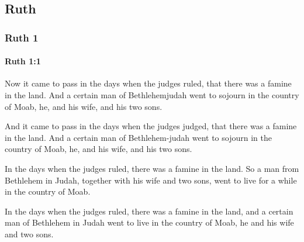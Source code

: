 \subsection{Ruth}
	\label{RUTH}

	\subsubsection{Ruth 1} %
		\label{RUTH-1}

		\paragraph{Ruth 1:1} %
			\label{RUTH-1-1}

			Now it came to pass in the days when the judges ruled, that there was a famine in the land. And a certain man of Bethlehemjudah went to sojourn in the country of Moab, he, and his wife, and his two sons.

			\begin{versebox}
					\item[BHS] 
					\item[LXX] 
					\item[ASV] And it came to pass in the days when the judges judged, that there was a famine in the land. And a certain man of Bethlehem-judah went to sojourn in the country of Moab, he, and his wife, and his two sons.
					\item[NIV] In the days when the judges ruled, there was a famine in the land. So a man from Bethlehem in Judah, together with his wife and two sons, went to live for a while in the country of Moab.
					\item[NRSV] In the days when the judges ruled, there was a famine in the land, and a certain man of Bethlehem in Judah went to live in the country of Moab, he and his wife and two sons.
			\end{versebox}


